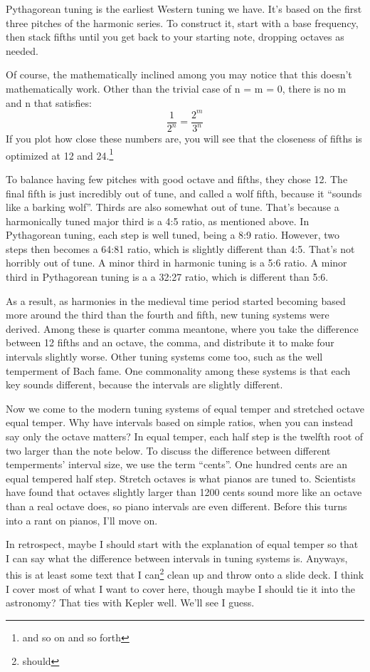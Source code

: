 \documentclass[12pt]{article}[titlepage]
\newcommand{\say}[1]{``#1''}
\newcommand{\1}{\={a}}
\newcommand{\2}{\={e}}
\newcommand{\3}{\={\i}}
\newcommand{\4}{\=o}
\newcommand{\5}{\=u}
\newcommand{\6}{\={A}}
\renewcommand{\,}{\textsuperscript{,}}
\begin{document}
Pythagorean tuning is the earliest Western tuning we have.
It's based on the first three pitches of the harmonic series.
To construct it, start with a base frequency, then stack fifths until you get back to your starting note, dropping octaves as needed.

Of course, the mathematically inclined among you may notice that this doesn't mathematically work.
Other than the trivial case of n = m = 0, there is no m and n that satisfies:
\begin{equation}
\frac{1}{2^n} = \frac{2^m}{3^n}
\end{equation}
If you plot how close these numbers are, you will see that the closeness of fifths is optimized at 12 and 24.\footnote{and so on and so forth}

To balance having few pitches with good octave and fifths, they chose 12.
The final fifth is just incredibly out of tune, and called a wolf fifth, because it \say{sounds like a barking wolf}.
Thirds are also somewhat out of tune.
That's because a harmonically tuned major third is a 4:5 ratio, as mentioned above.
In Pythagorean tuning, each step is well tuned, being a 8:9 ratio.
However, two steps then becomes a 64:81 ratio, which is slightly different than 4:5.
That's not horribly out of tune.
A minor third in harmonic tuning is a 5:6 ratio.
A minor third in Pythagorean tuning is a a 32:27 ratio, which is different than 5:6.

As a result, as harmonies in the medieval time period started becoming based more around the third than the fourth and fifth, new tuning systems were derived.
Among these is quarter comma meantone, where you take the difference between 12 fifths and an octave, the comma, and distribute it to make four intervals slightly worse.
Other tuning systems come too, such as the well temperment of Bach fame.
One commonality among these systems is that each key sounds different, because the intervals are slightly different.

Now we come to the modern tuning systems of equal temper and stretched octave equal temper.
Why have intervals based on simple ratios, when you can instead say only the octave matters?
In equal temper, each half step is the twelfth root of two larger than the note below. 
To discuss the difference between different temperments' interval size, we use the term \say{cents}.
One hundred cents are an equal tempered half step.
Stretch octaves is what pianos are tuned to.
Scientists have found that octaves slightly larger than 1200 cents sound more like an octave than a real octave does, so piano intervals are even different.
Before this turns into a rant on pianos, I'll move on.

In retrospect, maybe I should start with the explanation of equal temper so that I can say what the difference between intervals in tuning systems is.
Anyways, this is at least some text that I can\footnote{should} clean up and throw onto a slide deck.
I think I cover most of what I want to cover here, though maybe I should tie it into the astronomy?
That ties with Kepler well.
We'll see I guess.
\end{document}
